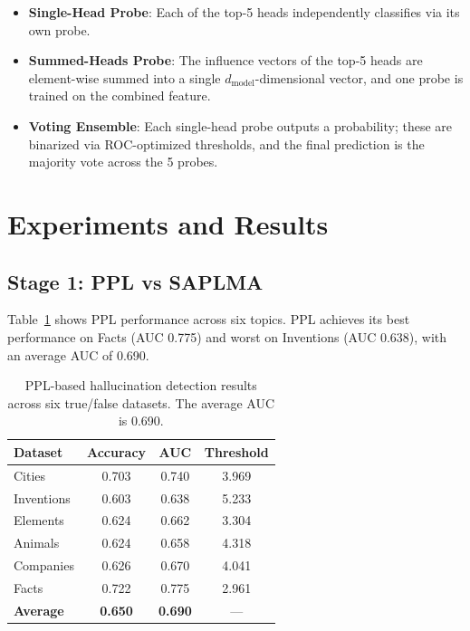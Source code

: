 \documentclass[11pt]{article}
\begin{document}
\begin{itemize}
    \item \textbf{Single-Head Probe}: Each of the top-5 heads independently classifies via its own probe.
    \item \textbf{Summed-Heads Probe}: The influence vectors of the top-5 heads are element-wise summed into a single $d_{\text{model}}$-dimensional vector, and one probe is trained on the combined feature.
    \item \textbf{Voting Ensemble}: Each single-head probe outputs a probability; these are binarized via ROC-optimized thresholds, and the final prediction is the majority vote across the 5 probes.
\end{itemize}

\section{Experiments and Results}

\subsection{Stage 1: PPL vs SAPLMA}
\label{sec:results_stage1}

Table~\ref{tab:ppl_metrics} shows PPL performance across six topics. PPL achieves its best performance on Facts (AUC 0.775) and worst on Inventions (AUC 0.638), with an average AUC of 0.690.

\begin{table}[t]
\centering
\begin{tabular}{lccc}
\toprule
\textbf{Dataset} & \textbf{Accuracy} & \textbf{AUC} & \textbf{Threshold} \\
\midrule
Cities       & 0.703 & 0.740 & 3.969 \\
Inventions   & 0.603 & 0.638 & 5.233 \\
Elements     & 0.624 & 0.662 & 3.304 \\
Animals      & 0.624 & 0.658 & 4.318 \\
Companies    & 0.626 & 0.670 & 4.041 \\
Facts        & 0.722 & 0.775 & 2.961 \\
\midrule
\textbf{Average} & \textbf{0.650} & \textbf{0.690} & --- \\
\bottomrule
\end{tabular}
\caption{PPL-based hallucination detection results across six true/false datasets. The average AUC is 0.690.}
\label{tab:ppl_metrics}
\end{table}
\end{document}
